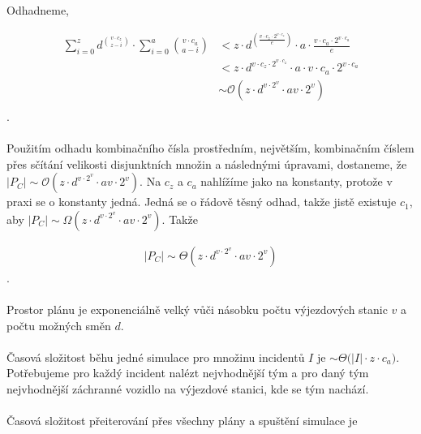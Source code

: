 \clearpage

Odhadneme,

\begin{align*}
  \sum_{i=0}^{z}{d^{v \cdot c_z \choose z - i}} \cdot \sum_{i = 0}^{a}{v \cdot c_a \choose a - i}
  &< z \cdot d^{\left( \frac{v \cdot c_z \cdot 2^{v \cdot c_z}}{e} \right)} \cdot a \cdot {\frac{v \cdot c_a \cdot 2^{v \cdot c_a}}{e}}\\
  &< z \cdot d^{v \cdot c_z \cdot 2^{v \cdot c_z}} \cdot a \cdot {v \cdot c_a \cdot 2^{v \cdot c_a}}\\
  &\sim \mathcal{O}(z \cdot d^{v \cdot 2^v} \cdot av \cdot 2^v)\\
\end{align*}
.
\\
\\
Použitím odhadu kombinačního čísla prostředním, největším, kombinačním číslem přes sčítání velikosti disjunktních množin a následnými úpravami,
dostaneme, že $|P_C| \sim \mathcal{O}(z \cdot d^{v \cdot 2^v} \cdot av \cdot 2^v)$.
Na $c_z$ a $c_a$ nahlížíme jako na konstanty, protože v praxi se o konstanty jedná. Jedná se o řádově těsný odhad, takže jistě existuje $c_1$, aby $|P_C| \sim \Omega(z \cdot d^{v \cdot 2^v} \cdot av \cdot 2^v)$.
Takže 

\begin{align*}
  |P_C| \sim \Theta{(z \cdot d^{v \cdot 2^v} \cdot av \cdot 2^v)}
\end{align*}
.
\\
\\
Prostor plánu je exponenciálně velký vůči násobku počtu výjezdových stanic $v$ a počtu možných směn $d$.
\\
\\
Časová složitost běhu jedné simulace pro množinu incidentů $I$ je $\sim \Theta{(|I| \cdot z \cdot c_a})$.
Potřebujeme pro každý incident nalézt nejvhodnější tým a pro daný tým nejvhodnější záchranné vozidlo na výjezdové stanici, kde se tým nachází.
\\
\\
Časová složitost přeiterování přes všechny plány a spuštění simulace je


